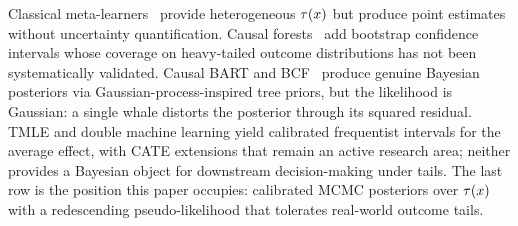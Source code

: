 Classical meta-learners~\citep{kunzel2019metalearners} provide
heterogeneous $\tau(x)$ but produce point estimates without uncertainty
quantification. Causal forests~\citep{wager2018estimation} add
bootstrap confidence intervals whose coverage on heavy-tailed outcome
distributions has not been systematically validated. Causal BART
\citep{hill2011bayesian} and BCF~\citep{hahn2020bcf} produce genuine
Bayesian posteriors via Gaussian-process-inspired tree priors, but
the likelihood is Gaussian: a single whale distorts the posterior
through its squared residual. TMLE and double machine learning
\citep[DML,][]{nie2021quasi} yield calibrated frequentist intervals
for the average effect, with CATE extensions that remain an active
research area; neither provides a Bayesian object for downstream
decision-making under tails. The last row is the position this paper
occupies: calibrated MCMC posteriors over $\tau(x)$ with a redescending
pseudo-likelihood that tolerates real-world outcome tails.
